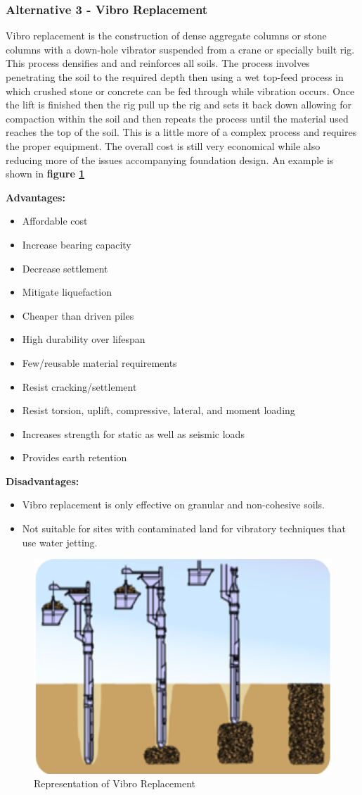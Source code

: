 \documentclass{ceri}
\begin{document}
\subsubsection{Alternative 3 - Vibro Replacement}
Vibro replacement is the construction of dense aggregate columns or stone columns with a down-hole vibrator suspended from a crane or specially built rig. This process densifies and and reinforces all soils. The process involves penetrating the soil to the required depth then using a wet top-feed process in which crushed stone or concrete can be fed through while vibration occurs. Once the lift is finished then the rig pull up the rig and sets it back down allowing for compaction within the soil and then repeats the process until the material used reaches the top of the soil. This is a little more of a complex process and requires the proper equipment. The overall cost is still very economical while also reducing more of the issues accompanying foundation design. An example is shown in \textbf{figure \ref{fig:Austin3}}

	\textbf{Advantages:}
\begin{itemize}
\item  Affordable cost
\item Increase bearing capacity
\item  Decrease settlement
\item  Mitigate liquefaction
\item  Cheaper than driven piles
\item  High durability over lifespan
\item  Few/reusable material requirements
\item  Resist cracking/settlement
\item  Resist torsion, uplift, compressive, lateral, and moment loading
\item  Increases strength for static as well as seismic loads
\item  Provides earth retention
\end{itemize}
        
	\textbf{Disadvantages:}
\begin{itemize}
\item Vibro replacement is only effective on granular and non-cohesive soils.
\item Not suitable for sites with contaminated land for vibratory techniques that use water jetting.
\end{itemize}
    
\begin{figure}[H]
    \centering
    \includegraphics[width=.35\textwidth]{images/Austin3.png}
    \caption{Representation of Vibro Replacement}
    \label{fig:Austin3}
\end{figure}    
    
\end{document}
